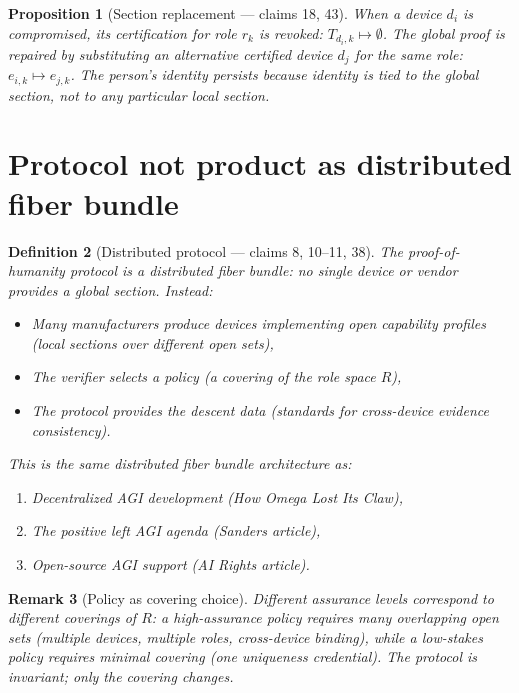 \documentclass[11pt,a4paper]{article}
\newtheorem{definition}{Definition}[section]
\newtheorem{proposition}[definition]{Proposition}
\newtheorem{remark}[definition]{Remark}
\begin{document}
\begin{proposition}[Section replacement --- claims 18, 43]
\label{prop:replacement}
When a device $d_i$ is compromised, its certification for role $r_k$ is
revoked: $T_{d_i, k} \mapsto \emptyset$. The global proof is repaired by
substituting an alternative certified device $d_j$ for the same role:
$e_{i,k} \mapsto e_{j,k}$. The person's identity persists because identity
is tied to the global section, not to any particular local section.
\end{proposition}

\section{Protocol not product as distributed fiber bundle}
\label{sec:protocol}

\begin{definition}[Distributed protocol --- claims 8, 10--11, 38]
\label{def:protocol}
The proof-of-humanity protocol is a distributed fiber bundle: no single
device or vendor provides a global section. Instead:
\begin{itemize}
\item Many manufacturers produce devices implementing open capability
  profiles (local sections over different open sets),
\item The verifier selects a policy (a covering of the role space $R$),
\item The protocol provides the descent data (standards for cross-device
  evidence consistency).
\end{itemize}
This is the same distributed fiber bundle architecture as:
\begin{enumerate}
\item Decentralized AGI development (How Omega Lost Its Claw),
\item The positive left AGI agenda (Sanders article),
\item Open-source AGI support (AI Rights article).
\end{enumerate}
\end{definition}

\begin{remark}[Policy as covering choice]
Different assurance levels correspond to different coverings of $R$:
a high-assurance policy requires many overlapping open sets (multiple
devices, multiple roles, cross-device binding), while a low-stakes policy
requires minimal covering (one uniqueness credential). The protocol is
invariant; only the covering changes.
\end{remark}
\end{document}
